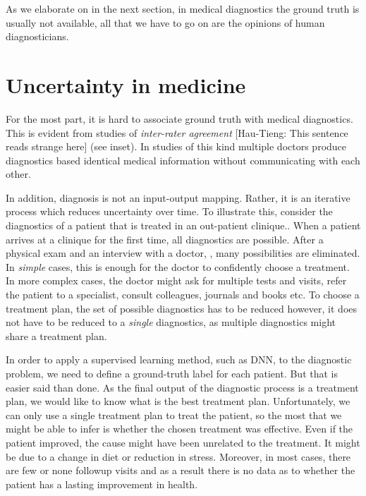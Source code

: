 \documentclass[11pt]{pnas-new}
\begin{document}
As we elaborate on in the next section, in medical diagnostics the
ground truth is usually not available, all that we have to go on are
the opinions of human diagnosticians.

\section{Uncertainty in medicine}

For the most part, it is hard to associate ground truth with medical
diagnostics. This is evident from studies of {\em inter-rater agreement} {\color{red}[Hau-Tieng: This sentence reads strange here]} (see
inset). In studies of this kind multiple doctors produce diagnostics
based identical medical information without communicating with each other. 



In addition, diagnosis is not an input-output mapping. Rather, it
is an iterative process which reduces uncertainty over time. To
illustrate this, consider the diagnostics of a patient that is treated
in an out-patient clinique..  When a patient arrives at a clinique for
the first time, all diagnostics are possible. After a physical exam
and an interview with a doctor, , many possibilities are
eliminated. In {\em simple} cases, this is enough for the doctor to
confidently choose a treatment. In more complex cases, the doctor
might ask for multiple tests and visits, refer the patient to a
specialist, consult colleagues, journals and books etc. To choose a
treatment plan, the set of possible diagnostics has to be reduced
however, it does not have to be reduced to a {\em single} diagnostics,
as multiple diagnostics might share a treatment plan.

In order to apply a supervised learning method, such as  DNN, to the
diagnostic problem, we need to define a ground-truth label for each
patient. But that is easier said than done. As the final output of the
diagnostic process is a treatment plan, we would like to know what is
the best treatment plan. Unfortunately, we can only use a single
treatment plan to treat the patient, so the most that we might be able
to infer is whether the chosen treatment was effective.  Even if the
patient improved, the cause might have been unrelated to the
treatment. It might be due to a change in diet or reduction in stress.
Moreover, in most cases, there are few or none followup visits and as
a result there is no data as to whether the patient has a lasting
improvement in health.

\end{document}
